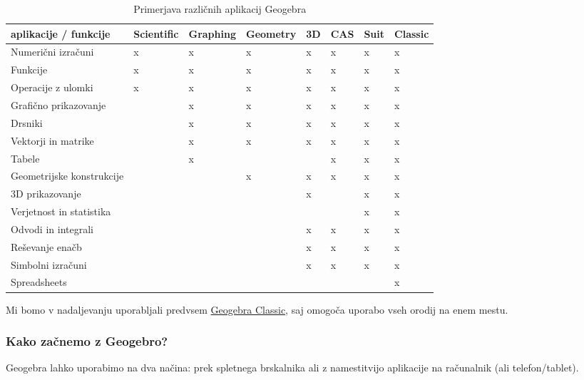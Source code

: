 \begin{table}
\centering
\caption[]{Primerjava različnih aplikacij Geogebra}
\label{tab_geogebra-apps}
\begin{tabular}{p{}p{}p{}p{}p{}p{}p{}p{}}
\toprule
aplikacije / funkcije & Scientific & Graphing & Geometry & 3D & CAS & Suit & Classic \\
\hline
Numerični izračuni & x & x & x & x & x & x & x \\
Funkcije & x & x & x & x & x & x & x \\
Operacije z ulomki & x & x & x & x & x & x & x \\
Grafično prikazovanje &  & x & x & x & x & x & x \\
Drsniki &  & x & x & x & x & x & x \\
Vektorji in matrike &  & x & x & x & x & x & x \\
Tabele &  & x &  &  & x & x & x \\
Geometrijske konstrukcije &  &  & x & x & x & x & x \\
3D prikazovanje &  &  &  & x &  & x & x \\
Verjetnost in statistika &  &  &  &  &  & x & x \\
Odvodi in integrali &  &  &  & x & x & x & x \\
Reševanje enačb &  &  &  & x & x & x & x \\
Simbolni izračuni &  &  &  & x & x & x & x \\
Spreadsheets &  &  &  &  &  &  & x \\
\bottomrule
\end{tabular}
\end{table}

Mi bomo v nadaljevanju uporabljali predvsem \href{https://www.geogebra.org/classic}{Geogebra Classic}, saj omogoča uporabo vseh orodij na enem mestu.

\subsubsection{Kako začnemo z Geogebro?}

Geogebra lahko uporabimo na dva načina: prek spletnega brskalnika ali z namestitvijo aplikacije na računalnik (ali telefon/tablet).

